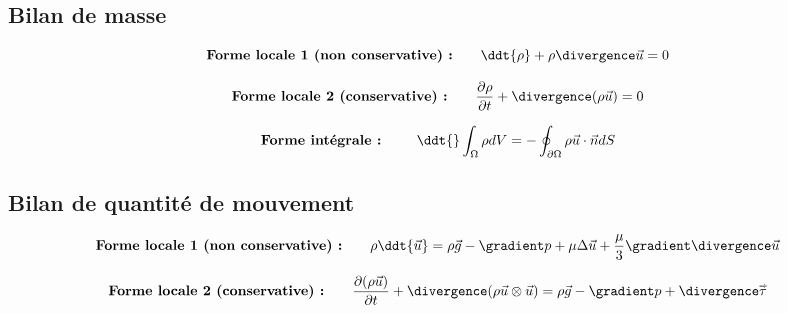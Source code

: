 \subsection{Bilan de masse}

\begin{equation}
\mbox{\bf Forme locale 1 (non conservative)  :} 
\qquad  
\ddt{\rho} + \rho \divergence \vec{u} = 0
\end{equation}

\begin{equation}
\mbox{\bf Forme locale 2 (conservative) :}
\qquad  
\dpa{\rho}{t} + \divergence ( \rho \vec{u})  = 0
\end{equation}

\begin{equation}
\mbox{\bf Forme intégrale : } 
\qquad  
\ddt{} \int_{\Omega}  \rho dV = - \oint_{\partial \Omega} \rho \vec{u} \cdot \vec{n} dS
\end{equation}


\subsection{Bilan de quantité de mouvement}

\begin{equation}
\mbox{\bf Forme locale 1 (non conservative)  :} 
\qquad  
		\rho \ddt{\vec{u}} 
		= 
		\rho \vec{g}  - \gradient p + \mu \Delta \vec{u} + \frac{\mu}{3} \gradient \divergence \vec{u} 
\end{equation}
	
	

\begin{equation}
\mbox{\bf Forme locale 2 (conservative) :}
\qquad  
	 \dpa{(\rho \vec{u})}{t} + \divergence (\rho \vec{u} \otimes \vec{u})
		= \rho \vec{g}  - \gradient p + \divergence \mytensor{\tau}
\end{equation}

